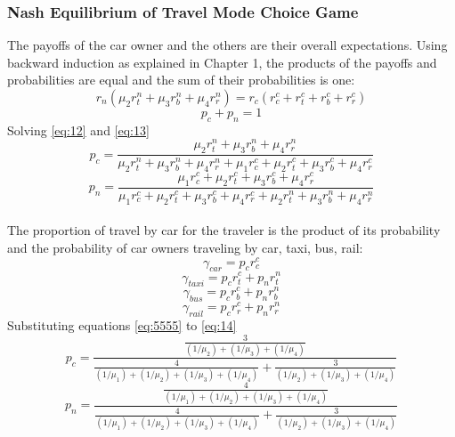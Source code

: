 \subsubsection{Nash Equilibrium of Travel Mode Choice Game}
The payoffs of the car owner and the others are their overall expectations. Using backward induction as explained in Chapter 1, the products of the payoffs and probabilities are equal and the sum of their probabilities is one: 
\begin{equation}\label{eq:12}
r_n(\mu_2 r^n_{t} + \mu_3 r^n_{b} + \mu_4 r^n_{r}) =  r_c(r^c_{c} + r^{c}_{t} + r^c_{b} + r^c_{r})
\end{equation}
\begin{equation}\label{eq:13}
p_c + p_n = 1
\end{equation}
Solving \ref{eq:12} and \ref{eq:13}
\begin{equation}
p_c = \frac{\mu_2 r^n_{t} + \mu_3 r^n_{b} + \mu_4 r^n_{r}}{\mu_2 r^n_{t} + \mu_3 r^n_{b} + \mu_4 r^n_{r} + \mu_1 r^c_{c} +  \mu_2 r^{c}_{t} + \mu_3 r^c_{b} + \mu_4 r^c_{r}}
\end{equation}
\begin{equation}
p_n = \frac{\mu_1 r^c_{c} +  \mu_2 r^{c}_{t} + \mu_3 r^c_{b} + \mu_4 r^c_{r}}{\mu_1 r^c_{c} +  \mu_2 r^{c}_{t} + \mu_3 r^c_{b} + \mu_4 r^c_{r} + \mu_2 r^n_{t} + \mu_3 r^n_{b} + \mu_4 r^n_{r}}
\end{equation}
\paragraph{}The proportion of travel by car for the traveler is the product of its probability and the probability of car owners traveling by car, taxi, bus, rail:  
\begin{equation}\label{eq:14}
\gamma_{car} = p_c r^c_c
\end{equation}
\begin{equation}
\gamma_{taxi} = p_c r^c_t + p_n r^n_t
\end{equation}
\begin{equation}
\gamma_{bus} = p_c r^c_b + p_n r^n_b
\end{equation}
\begin{equation}\label{eq:15}
\gamma_{rail} = p_c r^c_r + p_n r^n_r
\end{equation}
Substituting equations \ref{eq:5555} to \ref{eq:14}
\begin{equation}
p_{c} = \frac{\frac{3}{(1/\mu_2)+(1/\mu_3)+(1/\mu_4)}}{\frac{4}{(1/\mu_1)+(1/\mu_2)+(1/\mu_3)+(1/\mu_4)}+\frac{3}{(1/\mu_2)+(1/\mu_3)+(1/\mu_4)}}
\end{equation}
\begin{equation}
p_n{} = \frac{\frac{4}{(1/\mu_1)+(1/\mu_2)+(1/\mu_3)+(1/\mu_4)}}{\frac{4}{(1/\mu_1)+(1/\mu_2)+(1/\mu_3)+(1/\mu_4)}+\frac{3}{(1/\mu_2)+(1/\mu_3)+(1/\mu_4)}}
\end{equation}
